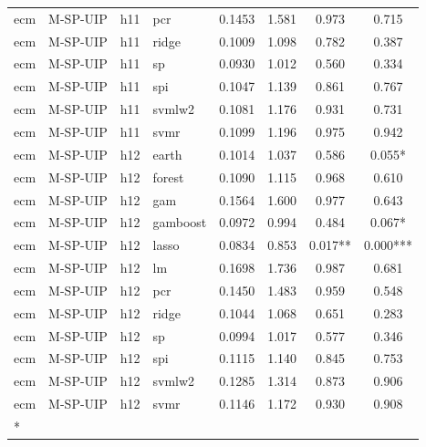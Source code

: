 \begin{ThreePartTable}
\begin{longtable}[t]{llclcccc}
ecm & M-SP-UIP & h11 & pcr & 0.1453 & 1.581 & 0.973 & 0.715\\
ecm & M-SP-UIP & h11 & ridge & 0.1009 & 1.098 & 0.782 & 0.387\\
ecm & M-SP-UIP & h11 & sp & 0.0930 & 1.012 & 0.560 & 0.334\\
ecm & M-SP-UIP & h11 & spi & 0.1047 & 1.139 & 0.861 & 0.767\\
ecm & M-SP-UIP & h11 & svmlw2 & 0.1081 & 1.176 & 0.931 & 0.731\\
ecm & M-SP-UIP & h11 & svmr & 0.1099 & 1.196 & 0.975 & 0.942\\
\addlinespace
ecm & M-SP-UIP & h12 & earth & 0.1014 & 1.037 & 0.586 & 0.055*\\
ecm & M-SP-UIP & h12 & forest & 0.1090 & 1.115 & 0.968 & 0.610\\
ecm & M-SP-UIP & h12 & gam & 0.1564 & 1.600 & 0.977 & 0.643\\
ecm & M-SP-UIP & h12 & gamboost & 0.0972 & 0.994 & 0.484 & 0.067*\\
ecm & M-SP-UIP & h12 & lasso & 0.0834 & 0.853 & 0.017** & 0.000***\\
ecm & M-SP-UIP & h12 & lm & 0.1698 & 1.736 & 0.987 & 0.681\\
ecm & M-SP-UIP & h12 & pcr & 0.1450 & 1.483 & 0.959 & 0.548\\
ecm & M-SP-UIP & h12 & ridge & 0.1044 & 1.068 & 0.651 & 0.283\\
ecm & M-SP-UIP & h12 & sp & 0.0994 & 1.017 & 0.577 & 0.346\\
ecm & M-SP-UIP & h12 & spi & 0.1115 & 1.140 & 0.845 & 0.753\\
ecm & M-SP-UIP & h12 & svmlw2 & 0.1285 & 1.314 & 0.873 & 0.906\\
ecm & M-SP-UIP & h12 & svmr & 0.1146 & 1.172 & 0.930 & 0.908\\*
\end{longtable}
\end{ThreePartTable}
\endgroup{}
